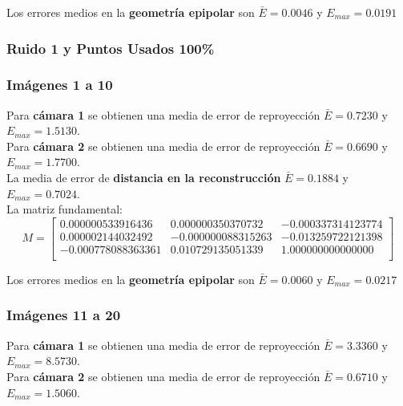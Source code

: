 \documentclass[a4paper, fontsize=11pt]{scrartcl} %
\numberwithin{equation}{section} %
\numberwithin{figure}{section} %
\numberwithin{table}{section} %
\begin{document}
	Los errores medios en la \textbf{geometría epipolar} son $\bar{E} =  0.0046$ y $E_{max} = 0.0191$
	
	
	\subsubsection{Ruido 1 y Puntos Usados 100\%}
	
	\subsubsection*{Imágenes 1 a 10}
	
	Para \textbf{cámara 1} se obtienen una media de error de reproyección $\bar{E} = 0.7230$ y $E_{max} = 1.5130$.\\
	Para \textbf{cámara 2} se obtienen una media de error de reproyección $\bar{E} = 0.6690$ y $E_{max} = 1.7700$.\\
	
	La media de error de \textbf{distancia en la reconstrucción} $\bar{E} = 0.1884$ y $E_{max} = 0.7024$.\\
	La matriz fundamental:
	\[
	M=
	\begin{bmatrix}
	0.000000533916436&	0.000000350370732&	-0.000337314123774 \\
	0.000002144032492&	-0.000000088315263&	-0.013259722121398 \\
	-0.000778088363361&	0.010729135051339&	1.000000000000000  \\
	
	\end{bmatrix}
	\]
	
	Los errores medios en la \textbf{geometría epipolar} son $\bar{E} = 0.0060$ y $E_{max} = 0.0217$
	
	\subsubsection*{Imágenes 11 a 20}
	
	Para \textbf{cámara 1} se obtienen una media de error de reproyección $\bar{E} = 3.3360$ y $E_{max} = 8.5730$.\\
	Para \textbf{cámara 2} se obtienen una media de error de reproyección $\bar{E} = 0.6710$ y $E_{max} = 1.5060$.\\
	
\end{document}
